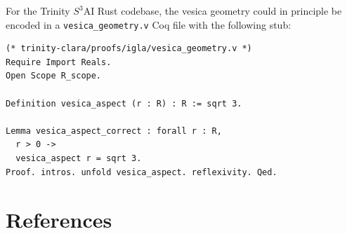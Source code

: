 For the Trinity \(S^3\)AI Rust codebase, the vesica geometry could
in principle be encoded in a \texttt{vesica\_geometry.v} Coq file
with the following stub:
\begin{verbatim}
(* trinity-clara/proofs/igla/vesica_geometry.v *)
Require Import Reals.
Open Scope R_scope.

Definition vesica_aspect (r : R) : R := sqrt 3.

Lemma vesica_aspect_correct : forall r : R,
  r > 0 ->
  vesica_aspect r = sqrt 3.
Proof. intros. unfold vesica_aspect. reflexivity. Qed.
\end{verbatim}

\section{References}\label{sec:ch11-references}

